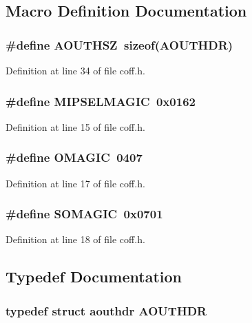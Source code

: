 \subsection{Macro Definition Documentation}
\subsubsection[{A\+O\+U\+T\+H\+SZ}]{\setlength{\rightskip}{0pt plus 5cm}\#define A\+O\+U\+T\+H\+SZ~sizeof({\bf A\+O\+U\+T\+H\+DR})}\label{coff_8h_a0e9ec1ae22e3b4646063ec0c59222597}


Definition at line 34 of file coff.\+h.

\subsubsection[{M\+I\+P\+S\+E\+L\+M\+A\+G\+IC}]{\setlength{\rightskip}{0pt plus 5cm}\#define M\+I\+P\+S\+E\+L\+M\+A\+G\+IC~0x0162}\label{coff_8h_a793adebbaaab0108473ed5c51bec05c7}


Definition at line 15 of file coff.\+h.

\subsubsection[{O\+M\+A\+G\+IC}]{\setlength{\rightskip}{0pt plus 5cm}\#define O\+M\+A\+G\+IC~0407}\label{coff_8h_a97312400ae67a4aaf0322e0f08ce6bc1}


Definition at line 17 of file coff.\+h.

\subsubsection[{S\+O\+M\+A\+G\+IC}]{\setlength{\rightskip}{0pt plus 5cm}\#define S\+O\+M\+A\+G\+IC~0x0701}\label{coff_8h_a910cfc09fc5c903922e2e909749b36e5}


Definition at line 18 of file coff.\+h.



\subsection{Typedef Documentation}
\subsubsection[{A\+O\+U\+T\+H\+DR}]{\setlength{\rightskip}{0pt plus 5cm}typedef struct {\bf aouthdr}  {\bf A\+O\+U\+T\+H\+DR}}\label{coff_8h_a177e3a967cec5918ec1c395b3648da05}

